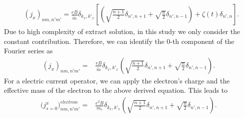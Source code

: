 \documentclass{article}
\begin{document}
\begin{itemize}
{\begin{equation}
    \begin{aligned}
      &\left({j}_x \right)_{nm,n'm'} =
      \frac{eB}{{\widetilde{m}}}
      \delta_{k_x,k'_x}
      \left[
      \left(\sqrt{\frac{n+1}{2}} \delta_{n',n+1} + \sqrt{\frac{n}{2}}
      \delta_{n',n-1}\right)
      + \zeta(t) \delta_{n',n}
      \right].
    \end{aligned}
  \end{equation}
  Due to high complexity of extract solution, in this study we only consider the constant contribution. Therefore, we can identify the $0$-th component of the Fourier series as
  \begin{equation} \tag{D11}
    \begin{aligned}
        \left({j}_x \right)_{nm,n'm'} =&
        \frac{eB}{\widetilde{m}}
        \delta_{k_x,k'_x}
        \left(\sqrt{\frac{n+1}{2}} \delta_{n',n+1} + \sqrt{\frac{n}{2}}
        \delta_{n',n-1} \right).
    \end{aligned}
  \end{equation}
  For a electric current operator, we can apply the electron's charge and the  effective mass of the electron to the above derived equation. This leads to
  \begin{equation} \tag{D12}
    \begin{aligned}
        \Big({j}^x_{s=0}\Big)_{nm,n'm'}^{electron}  =&
        \frac{e^2B}{{m_e}}
        \delta_{k_x,k'_x}
        \left(\sqrt{\frac{n+1}{2}} \delta_{n',n+1} + \sqrt{\frac{n}{2}}
        \delta_{n',n-1} \right).
    \end{aligned}
  \end{equation}

}
\end{itemize}
\end{document}
